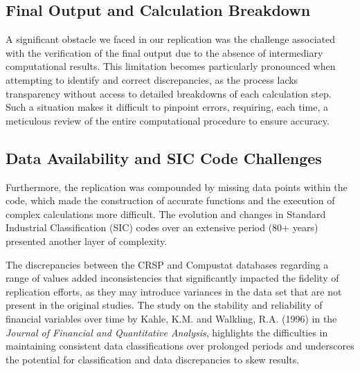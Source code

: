 \documentclass{article}
\begin{document}
\subsection*{Final Output and Calculation Breakdown}

A significant obstacle we faced in our replication was the challenge associated with the verification of the final output due to the absence of intermediary computational results. This limitation becomes particularly pronounced when attempting to identify and correct discrepancies, as the process lacks transparency without access to detailed breakdowns of each calculation step. Such a situation makes it difficult to pinpoint errors, requiring, each time, a meticulous review of the entire computational procedure to ensure accuracy.

\subsection*{Data Availability and SIC Code Challenges}

Furthermore, the replication was compounded by missing data points within the code, which made the construction of accurate functions and the execution of complex calculations more difficult. The evolution and changes in Standard Industrial Classification (SIC) codes over an extensive period (80+ years) presented another layer of complexity. 

The discrepancies between the CRSP and Compustat databases regarding a range of values added inconsistencies that significantly impacted the fidelity of replication efforts, as they may introduce variances in the data set that are not present in the original studies. The study on the stability and reliability of financial variables over time by Kahle, K.M. and Walkling, R.A. (1996) in the \textit{Journal of Financial and Quantitative Analysis}, highlights the difficulties in maintaining consistent data classifications over prolonged periods and underscores the potential for classification and data discrepancies to skew results.
\end{document}
